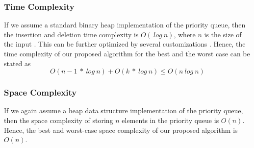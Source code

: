 \subsubsection{Time Complexity}
If we assume a standard binary heap implementation of the priority queue, then the insertion and deletion time complexity is $O(\:log\:n)$, where $n$ is the size of the input \cite{heap1}. This can be further optimized by several customizations \cite{heap2}. Hence, the time complexity of our proposed algorithm for the best and the worst case can be stated as
\begin{equation}
    O(n-1\:*\:log\:n) + O(k\:*\:log\:n) \leq O(n\: log\:n)
\end{equation}

\subsubsection{Space Complexity}
If we again assume a heap data structure implementation of the priority queue, then the space complexity of storing $n$ elements in the priority queue is $O(n)$\cite{heap1}. Hence, the best and worst-case space complexity of our proposed algorithm is $O(n)$.

